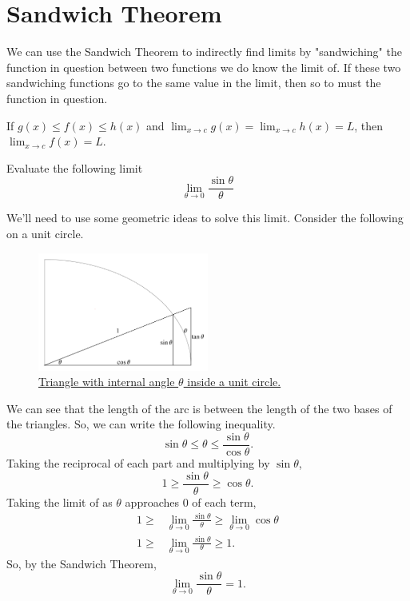\section{Sandwich Theorem}
We can use the Sandwich Theorem to indirectly find limits by "sandwiching" the function in question between two functions we do know the limit of.
If these two sandwiching functions go to the same value in the limit, then so to must the function in question.
\begin{theorem}
	If $g(x) \leq f(x) \leq h(x)$ and $\lim_{x \to c}{g(x)} = \lim_{x\to c}{h(x)} = L$, then $\lim_{x \to c}{f(x)} = L$.
\end{theorem}

\begin{example}
	Evaluate the following limit
	\begin{equation*}
		\lim_{\theta \to 0}{\frac{\sin{\theta}}{\theta}}
	\end{equation*}
\end{example}
We'll need to use some geometric ideas to solve this limit.
Consider the following on a unit circle.

\begin{figure}[H]
	\label{sin_limit_proof}
	\centering
	\includegraphics[width = 0.5\textwidth]{./limits_continuity/sin_limit_proof.png}
	\caption{\hyperref{}{}{}{Triangle with internal angle $\theta$ inside a unit circle.}}
\end{figure}

We can see that the length of the arc is between the length of the two bases of the triangles.
So, we can write the following inequality.
\begin{equation*}
	\sin{\theta} \leq \theta \leq \frac{\sin{\theta}}{\cos{\theta}}.
\end{equation*}
\indent
Taking the reciprocal of each part and multiplying by $\sin{\theta}$,
\begin{equation*}
	1 \geq \frac{\sin{\theta}}{\theta} \geq \cos{\theta}.
\end{equation*}
\indent
Taking the limit of as $\theta$ approaches 0 of each term,
\begin{align*}
	1 \geq & \lim_{\theta \to 0}{\frac{\sin{\theta}}{\theta}} \geq \lim_{\theta\to 0}{\cos{\theta}} \\
	1 \geq & \lim_{\theta \to 0}{\frac{\sin{\theta}}{\theta}} \geq 1.
\end{align*}
\indent
So, by the Sandwich Theorem,
\begin{equation*}
	\lim_{\theta \to 0}{\frac{\sin{\theta}}{\theta}} = 1.
\end{equation*}